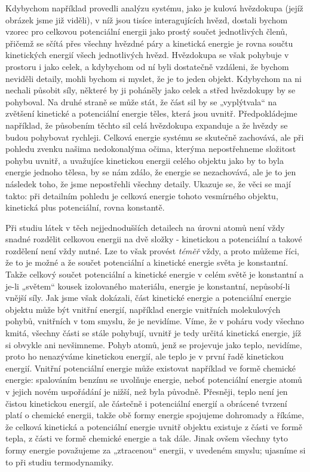     Kdybychom například provedli analýzu systému, jako je kulová hvězdokupa (jejíž obrázek jsme již 
    viděli), v níž jsou tisíce interagujících hvězd, dostali bychom vzorec pro celkovou potenciální 
    energii jako prostý součet jednotlivých členů, přičemž se sčítá přes všechny hvězdné páry a 
    kinetická energie je rovna součtu kinetických energií všech jednotlivých hvězd. Hvězdokupa se 
    však pohybuje v prostoru i jako celek, a kdybychom od ní byli dostatečně vzdáleni, že bychom 
    neviděli detaily, mohli bychom si myslet, že je to jeden objekt. Kdybychom na ni nechali 
    působit síly, některé by ji poháněly jako celek a střed hvězdokupy by se pohyboval. Na druhé 
    straně se může stát, že část sil by se „vyplýtvala“ na zvětšení kinetické a potenciální energie 
    těles, která jsou uvnitř. Předpokládejme například, že působením těchto sil celá hvězdokupa 
    expanduje a že hvězdy se budou pohybovat rychleji. Celková energie systému se skutečně 
    zachovává, ale při pohledu zvenku našima nedokonalýma očima, kterýma nepostřehneme složitost 
    pohybu uvnitř, a uvažujíce kinetickou energii celého objektu jako by to byla energie jednoho 
    tělesa, by se nám zdálo, že energie se nezachovává, ale je to jen následek toho, že jsme 
    nepostřehli všechny detaily. Ukazuje se, že věci se mají takto: při detailním pohledu je 
    celková energie tohoto vesmírného objektu, kinetická plus potenciální, rovna konstantě.
    
    Při studiu látek v těch nejjednodušších detailech na úrovni atomů není vždy snadné rozdělit 
    celkovou energii na dvě složky - kinetickou a potenciální a takové rozdělení není vždy nutné. 
    Lze to však provést \emph{téměř} vždy, a proto můžeme říci, že to je možné a že součet 
    potenciální a kinetické energie světa je konstantní. Takže celkový součet potenciální a 
    kinetické energie v celém světě je konstantní a je-li „světem“ kousek izolovaného materiálu, 
    energie je konstantní, nepůsobí-li vnější síly. Jak jsme však dokázali, část kinetické energie 
    a potenciální energie objektu může být vnitřní energií, například energie vnitřních 
    molekulových pohybů, vnitřních v tom smyslu, že je nevidíme. Víme, že v poháru vody všechno 
    kmitá, všechny části se stále pohybují, uvnitř je tedy určitá kinetická energie, jíž si obvykle 
    ani nevšimneme. Pohyb atomů, jenž se projevuje jako teplo, nevidíme, proto ho nenazýváme 
    kinetickou energií, ale teplo je v první řadě kinetickou energií. Vnitřní potenciální energie 
    může existovat například ve formě chemické energie: spalováním benzínu se uvolňuje energie, 
    neboť potenciální energie atomů v jejich novém uspořádání je nižší, než byla původně. Přesněji, 
    teplo není jen čistou kinetickou energií, ale částečně i potenciální energií a obrácené tvrzení 
    platí o chemické energii, takže obě formy energie spojujeme dohromady a říkáme, že celková 
    kinetická a potenciální energie uvnitř objektu existuje z části ve formě tepla, z části ve 
    formě chemické energie a tak dále. Jinak ovšem všechny tyto formy energie považujeme za 
    „ztracenou“ energii, v uvedeném smyslu; ujasníme si to při studiu termodynamiky.
    
